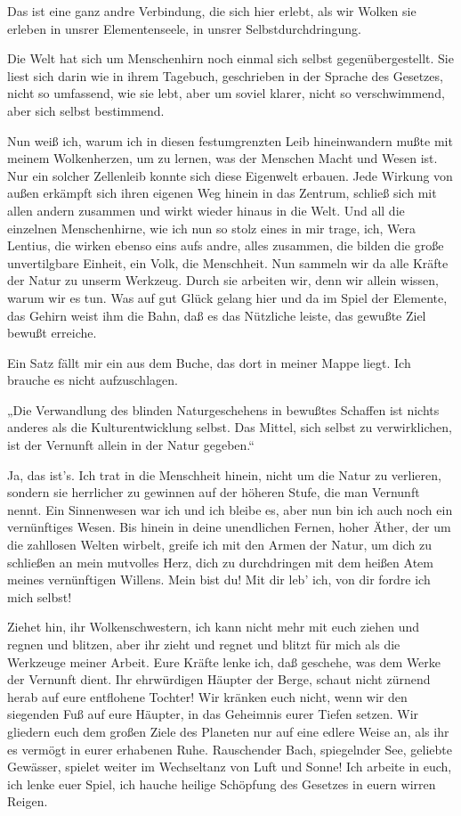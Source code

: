 Das ist eine ganz andre Verbindung, die sich hier erlebt, als wir
Wolken sie erleben in unsrer Elementenseele, in unsrer
Selbstdurchdringung.

Die Welt hat sich um Menschenhirn noch einmal sich selbst
gegenübergestellt. Sie liest sich darin wie in ihrem Tagebuch,
geschrieben in der Sprache des Gesetzes, nicht so umfassend, wie
sie lebt, aber um soviel klarer, nicht so verschwimmend, aber sich
selbst bestimmend.

Nun weiß ich, warum ich in diesen festumgrenzten Leib hineinwandern
mußte mit meinem Wolkenherzen, um zu lernen, was der Menschen Macht
und Wesen ist. Nur ein solcher Zellenleib konnte sich diese
Eigenwelt erbauen. Jede Wirkung von außen erkämpft sich ihren
eigenen Weg hinein in das Zentrum, schließ sich mit allen andern
zusammen und wirkt wieder hinaus in die Welt. Und all die einzelnen
Menschenhirne, wie ich nun so stolz eines in mir trage, ich, Wera
Lentius, die wirken ebenso eins aufs andre, alles zusammen, die
bilden die große unvertilgbare Einheit, ein Volk, die Menschheit.
Nun sammeln wir da alle Kräfte der Natur zu unserm Werkzeug. Durch
sie arbeiten wir, denn wir allein wissen, warum wir es tun. Was auf
gut Glück gelang hier und da im Spiel der Elemente, das Gehirn
weist ihm die Bahn, daß es das Nützliche leiste, das gewußte Ziel
bewußt erreiche.

Ein Satz fällt mir ein aus dem Buche, das dort in meiner Mappe
liegt. Ich brauche es nicht aufzuschlagen.

„Die Verwandlung des blinden Naturgeschehens in bewußtes Schaffen
ist nichts anderes als die Kulturentwicklung selbst. Das Mittel,
sich selbst zu verwirklichen, ist der Vernunft allein in der Natur
gegeben.“

Ja, das ist's. Ich trat in die Menschheit hinein, nicht um die
Natur zu verlieren, sondern sie herrlicher zu gewinnen auf der
höheren Stufe, die man Vernunft nennt. Ein Sinnenwesen war ich und
ich bleibe es, aber nun bin ich auch noch ein vernünftiges Wesen.
Bis hinein in deine unendlichen Fernen, hoher Äther, der um die
zahllosen Welten wirbelt, greife ich mit den Armen der Natur, um
dich zu schließen an mein mutvolles Herz, dich zu durchdringen mit
dem heißen Atem meines vernünftigen Willens. Mein bist du! Mit dir
leb' ich, von dir fordre ich mich selbst!

Ziehet hin, ihr Wolkenschwestern, ich kann nicht mehr mit euch
ziehen und regnen und blitzen, aber ihr zieht und regnet und blitzt
für mich als die Werkzeuge meiner Arbeit. Eure Kräfte lenke ich,
daß geschehe, was dem Werke der Vernunft dient. Ihr ehrwürdigen
Häupter der Berge, schaut nicht zürnend herab auf eure entflohene
Tochter! Wir kränken euch nicht, wenn wir den siegenden Fuß auf
eure Häupter, in das Geheimnis eurer Tiefen setzen. Wir gliedern
euch dem großen Ziele des Planeten nur auf eine edlere Weise an,
als ihr es vermögt in eurer erhabenen Ruhe. Rauschender Bach,
spiegelnder See, geliebte Gewässer, spielet weiter im Wechseltanz
von Luft und Sonne! Ich arbeite in euch, ich lenke euer Spiel, ich
hauche heilige Schöpfung des Gesetzes in euern wirren Reigen.

